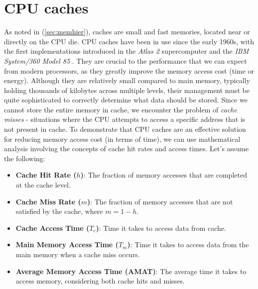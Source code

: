 \section{CPU caches}

As noted in (\ref{sec:memhier}), caches are small and fast memories, located near or directly on the CPU die. CPU caches have been in use since the early 1960s, with the first
implementations introduced in the \textit{Atlas 2} supercomputer \cite{oldcomputercache2} and the \textit{IBM System/360 Model 85} \cite{oldcomputercache1}. They are crucial to the
performance that we can expect from modern processors, as they greatly improve the memory access cost (time or energy). Although they are relatively small compared to main memory,
typically holding thousands of kilobytes across multiple levels, their management must be quite sophisticated to correctly determine what data should be stored. Since we cannot %
store the entire memory in cache, we encounter the problem of \textit{cache misses} - situations where the CPU attempts to access a specific address that is not present in 
cache. To demonstrate that CPU caches are an effective solution for reducing memory access cost (in terms of time), we can use mathematical analysis involving the concepts of cache %
hit rates and access times. Let's assume the following:

\begin{itemize}
    \item \textbf{Cache Hit Rate ($h$)}: The fraction of memory accesses that are completed at the cache level.
    \item \textbf{Cache Miss Rate ($m$)}: The fraction of memory accesses that are not satisfied by the cache, where $m = 1 - h$.
    \item \textbf{Cache Access Time ($T_c$)}: Time it takes to access data from cache.
    \item \textbf{Main Memory Access Time ($T_m$)}: Time it takes to access data from the main memory when a cache miss occurs.
    \item \textbf{Average Memory Access Time (AMAT)}: The average time it takes to access memory, considering both cache hits and misses.
\end{itemize}

